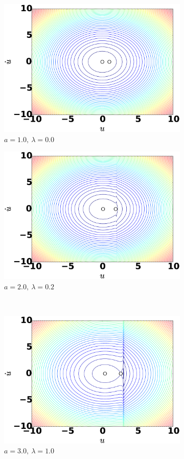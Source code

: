 \documentclass[12pt, a4paper]{extreport}
\begin{document}
\begin{figure}[H]
	\centering
	\begin{subfigure}[h]{8.0 cm}
		\includegraphics[width=8.0 cm]{figure/mechanical_a10_lambda0.eps}
		\caption{$a=1.0,\ \lambda = 0.0$}
	\end{subfigure}
	\begin{subfigure}[h]{8.0 cm}
        \includegraphics[width=8.0 cm]{figure/mechanical_a20_lambda2.eps}
		\caption{$a=2.0,\ \lambda = 0.2$}
    \end{subfigure}
    \\
    \begin{subfigure}[h]{8.0 cm}
		\includegraphics[width=8.0 cm]{figure/mechanical_a30_lambda10.eps}
		\caption{$a=3.0,\ \lambda = 1.0$}
	\end{subfigure}
	\begin{subfigure}[h]{8.0 cm}

\end{subfigure}
\end{figure}
\end{document}
